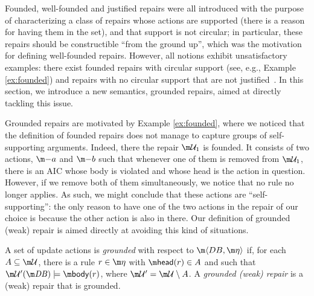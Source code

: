 Founded, well-founded and justified repairs were all introduced with the purpose of characterizing a class of repairs whose actions are supported (there is a reason for having them in the set), and that support is not circular; in particular, these repairs should be constructible ``from the ground up'', which was the motivation for defining well-founded repairs.
However, all notions exhibit unsatisfactory examples: there exist founded repairs with circular support (see, e.g., Example \ref{ex:founded}) and repairs with no circular support that are not justified~\cite{CEGN13}. %
In this section, we introduce a new semantics, grounded repairs, aimed at directly tackling this issue. 

Grounded repairs are motivated by Example \ref{ex:founded}, where we noticed that the definition of founded repairs does not manage to capture groups of self-supporting arguments. 
Indeed, there the repair $\UU_1$ is founded. It consists of two actions, $\remove a$ and $\remove b$ such that whenever one of them is removed from $\UU_1$, there is an AIC whose body is violated and whose head is the action in question. 
However, if we remove both of them simultaneously, we notice that no rule no longer applies. As such, we might conclude that these actions are ``self-supporting'': the only reason to have one of the two actions in the repair of our choice is because the other action is also in there. 
Our definition of grounded (weak) repair is aimed directly at avoiding this kind of situations. 

\begin{definition}\label{def:grounded}
 A set of update actions \UU is \emph{grounded} with respect to $\fulldb$ if, for each $A \subseteq  \UU$, there is a rule  $r\in \aics$ with $\head(r)\in A$ and such that $\UU'(\db)\models \body(r)$, where $\UU'=\UU\setminus A$. A \emph{grounded (weak) repair} is a (weak) repair that is grounded.
 \end{definition}
  
